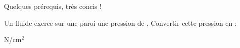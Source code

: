 \begin{prerequis}
	Quelques prérequis, très concis !
\end{prerequis}









\hauteurLargeurCadreReponse		{6mm}{3cm}
\initialisationEntrainement

Un fluide exerce sur une paroi une pression de . Convertir cette pression en :

\debutEntrainement


\begin{enonce}
N/cm$^2$
\end{enonce}

